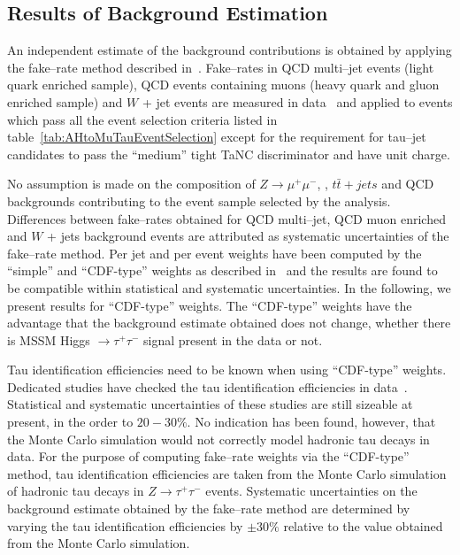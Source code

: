 \subsection{Results of Background Estimation}
%
An independent estimate of the background contributions is obtained by applying
the fake--rate method described in~\cite{CMS_AN_2010-074}.  Fake--rates in QCD
multi--jet events (light quark enriched sample), QCD events containing muons
(heavy quark and gluon enriched sample) and $W$ + jet events are measured in
data~\cite{CMS-PAS-PFT-10-004,CMS-PAS-TAU-11-001} and applied to events which pass all the
event selection criteria listed in table~\ref{tab:AHtoMuTauEventSelection}
except for the requirement for tau--jet candidates to pass the ``medium'' tight
TaNC discriminator and have unit charge.

No assumption is made on the composition of $Z \to \mu^{+} \mu^{-}$, \WpJets,
$t\bar{t} + jets$ and QCD backgrounds contributing to the event sample selected
by the analysis.  Differences between fake--rates obtained for QCD multi--jet,
QCD muon enriched and $W$ + jets background events are attributed as systematic
uncertainties of the fake--rate method.  Per jet and per event weights have been
computed by the ``simple'' and ``CDF-type'' weights as described
in~\cite{CMS_AN_2010-074} and the results are found to be compatible within
statistical and systematic uncertainties.  In the following, we present results
for ``CDF-type'' weights.  The ``CDF-type'' weights have the advantage that the
background estimate obtained does not change, whether there is MSSM Higgs $\to
\tau^{+} \tau^{-}$ signal present in the data or not.

Tau identification efficiencies need to be known when using ``CDF-type''
weights.  Dedicated studies have checked the tau identification efficiencies in
data~\cite{CMS-PAS-TAU-11-001}.  Statistical and systematic uncertainties of
these studies are still sizeable at present, in the order to $20-30\%$.  No
indication has been found, however, that the Monte Carlo simulation would not
correctly model hadronic tau decays in data.  For the purpose of computing
fake--rate weights via the ``CDF-type'' method, tau identification efficiencies
are taken from the Monte Carlo simulation of hadronic tau decays in $Z \to
\tau^{+} \tau^{-}$ events.  Systematic uncertainties on the background estimate
obtained by the fake--rate method are determined by varying the tau
identification efficiencies by $\pm 30\%$ relative to the value obtained from
the Monte Carlo simulation.

